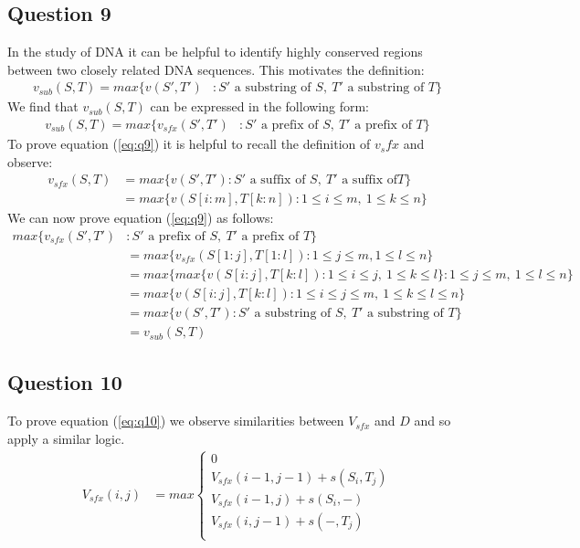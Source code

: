 \documentclass[a4paper]{article}
\begin{document}
\subsection*{Question 9}
In the study of DNA it can be helpful to identify highly conserved regions between two closely related DNA sequences. This motivates the definition:
\begin{align*}
    v_{sub}(S,T) = max\big\{ v(S',T') &: S' \text{ a substring of } S,\ T' \text{ a substring of } T \big\}
\end{align*}
We find that $v_{sub}(S,T)$ can be expressed in the following form:
\begin{align}\label{eq:q9}
    v_{sub}(S,T) = max\big\{ v_{sfx}(S',T') &: S' \text{ a prefix of } S,\ T' \text{ a prefix of } T \big\}
\end{align}
To prove equation (\ref{eq:q9}) it is helpful to recall the definition of $v_sfx$ and observe:
\begin{align*}
    v_{sfx}(S,T) &= max\big\{ v(S',T') : S' \text{ a suffix of } S,\ T' \text{ a suffix of} T \big\} \\
                 &= max\big\{ v(S[i:m],T[k:n]) : 1\leq i\leq m,\ 1\leq k\leq n \big\}
\end{align*}
We can now prove equation (\ref{eq:q9}) as follows:
\begin{align*}
        max\big\{ v_{sfx}(S',T') &: S' \text{ a prefix of } S,\ T' \text{ a prefix of } T \big\} \\
        &= max\big\{ v_{sfx}(S[1:j],T[1:l]) : 1\leq j\leq m, 1\leq l\leq n \big\} \\
        &= max\Big\{ max\big\{ v(S[i:j],T[k:l]) : 1\leq i\leq j,\ 1\leq k\leq l \big\} : 1\leq j\leq m,\ 1\leq l\leq n \Big\} \\
        &= max\big\{ v(S[i:j],T[k:l]) : 1\leq i\leq j\leq m,\ 1\leq k \leq l\leq n \big\} \\
        &= max\big\{ v(S',T') : S' \text{ a substring of } S,\ T' \text{ a substring of } T \big\} \\
        &= v_{sub}(S,T)
\end{align*}

\subsection*{Question 10}

To prove equation (\ref{eq:q10}) we observe similarities between $V_{sfx}$ and $D$ and so apply a similar logic.
\begin{align}\label{eq:q10}
    V_{sfx}(i,j) &= max
    \begin{cases}
        0 \\
        V_{sfx}(i-1,j-1) + s(S_i,T_j) \\
        V_{sfx}(i-1,j) + s(S_i,-) \\
        V_{sfx}(i,j-1) + s(-,T_j) \\
    \end{cases}
\end{align}
\end{document}
